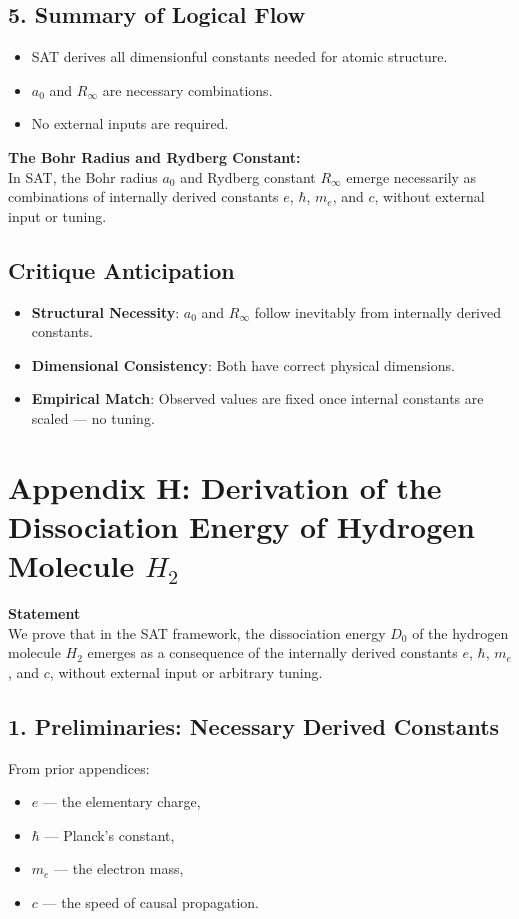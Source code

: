 \documentclass[12pt]{article}
\begin{document}
\subsection*{5. Summary of Logical Flow}
\begin{itemize}
    \item SAT derives all dimensionful constants needed for atomic structure.
    \item \(a_0\) and \(R_\infty\) are necessary combinations.
    \item No external inputs are required.
\end{itemize}

\begin{mdframed}[linewidth=1pt, roundcorner=5pt, backgroundcolor=white]
\textbf{The Bohr Radius and Rydberg Constant:} \\
In SAT, the Bohr radius \( a_0 \) and Rydberg constant \( R_\infty \) emerge necessarily as combinations of internally derived constants \( e \), \( \hbar \), \( m_e \), and \( c \), without external input or tuning.
\end{mdframed}

\subsection*{Critique Anticipation}
\begin{itemize}
    \item \textbf{Structural Necessity}: \(a_0\) and \(R_\infty\) follow inevitably from internally derived constants.
    \item \textbf{Dimensional Consistency}: Both have correct physical dimensions.
    \item \textbf{Empirical Match}: Observed values are fixed once internal constants are scaled — no tuning.
\end{itemize}

\newpage
\section*{Appendix H: Derivation of the Dissociation Energy of Hydrogen Molecule \(H_2\)}

\textbf{Statement} \\
We prove that in the SAT framework, the dissociation energy \(D_0\) of the hydrogen molecule \(H_2\) emerges as a consequence of the internally derived constants \(e\), \(\hbar\), \(m_e\), and \(c\), without external input or arbitrary tuning.

\subsection*{1. Preliminaries: Necessary Derived Constants}
From prior appendices:
\begin{itemize}
    \item \(e\) — the elementary charge,
    \item \(\hbar\) — Planck’s constant,
    \item \(m_e\) — the electron mass,
    \item \(c\) — the speed of causal propagation.
\end{itemize}
\end{document}
